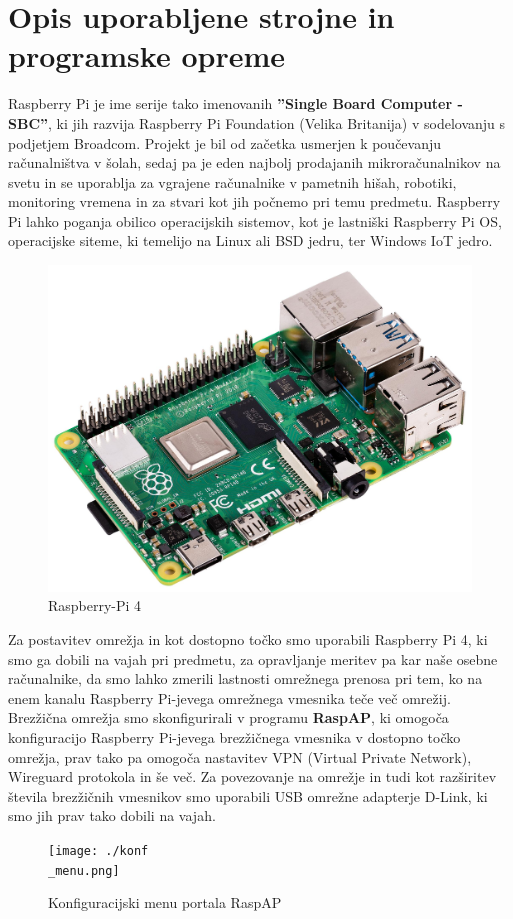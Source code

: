 \documentclass[11pt,a4paper,slovene]{article}
\begin{document}
\section{Opis uporabljene strojne in programske opreme}
Raspberry Pi je ime serije tako imenovanih \textbf{''Single Board Computer - SBC''}, ki jih razvija Raspberry Pi Foundation (Velika Britanija) v sodelovanju s podjetjem Broadcom. Projekt je bil od začetka usmerjen k poučevanju računalništva v šolah, sedaj pa je eden najbolj prodajanih mikroračunalnikov na svetu in se uporablja za vgrajene računalnike v pametnih hišah, robotiki, monitoring vremena in za stvari kot jih počnemo pri temu predmetu. Raspberry Pi lahko poganja obilico operacijskih sistemov, kot je lastniški Raspberry Pi OS, operacijske siteme, ki temelijo na Linux ali BSD jedru, ter Windows IoT jedro.\cite{enwiki:1146984021}\\
\begin{figure}[H]
\includegraphics[width=\linewidth]{./rpi4.jpg}
\centering
\caption{Raspberry-Pi 4}
\end{figure}

Za postavitev omrežja in kot dostopno točko smo uporabili Raspberry Pi 4, ki smo ga dobili na vajah pri predmetu, za opravljanje meritev pa kar naše osebne računalnike, da smo lahko zmerili lastnosti omrežnega prenosa pri tem, ko na enem kanalu Raspberry Pi-jevega omrežnega vmesnika teče več omrežij. Brezžična omrežja smo skonfigurirali v programu \textbf{RaspAP}, ki omogoča konfiguracijo Raspberry Pi-jevega brezžičnega vmesnika v dostopno točko omrežja, prav tako pa omogoča nastavitev VPN (Virtual Private Network), Wireguard protokola in še več.\cite{raspap} Za povezovanje na omrežje in tudi kot razširitev števila brezžičnih vmesnikov smo uporabili USB omrežne adapterje D-Link, ki smo jih prav tako dobili na vajah.\\
\begin{figure}[H]
	\texttt{[image: ./konf\\\_menu.png]}
	\centering
	\caption{Konfiguracijski menu portala RaspAP}
\end{figure}
\end{document}
